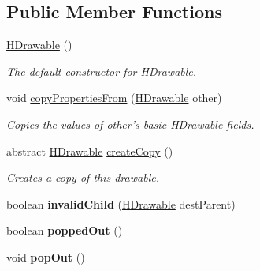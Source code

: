 \subsection*{Public Member Functions}
\begin{DoxyCompactItemize}
\item 
\hyperlink{classhype_1_1core_1_1drawable_1_1_h_drawable_ad92f7d4141143ac12489529b431a72e2}{H\-Drawable} ()
\begin{DoxyCompactList}\small\item\em The default constructor for \hyperlink{classhype_1_1core_1_1drawable_1_1_h_drawable}{H\-Drawable}. \end{DoxyCompactList}\item 
void \hyperlink{classhype_1_1core_1_1drawable_1_1_h_drawable_a5a24d647e0e8b14177218807e84ecde5}{copy\-Properties\-From} (\hyperlink{classhype_1_1core_1_1drawable_1_1_h_drawable}{H\-Drawable} other)
\begin{DoxyCompactList}\small\item\em Copies the values of {\ttfamily other}'s basic \hyperlink{classhype_1_1core_1_1drawable_1_1_h_drawable}{H\-Drawable} fields. \end{DoxyCompactList}\item 
abstract \hyperlink{classhype_1_1core_1_1drawable_1_1_h_drawable}{H\-Drawable} \hyperlink{classhype_1_1core_1_1drawable_1_1_h_drawable_aaee2df6588cdeebe4399e3e56af76410}{create\-Copy} ()
\begin{DoxyCompactList}\small\item\em Creates a copy of this drawable. \end{DoxyCompactList}\item 
\hypertarget{classhype_1_1core_1_1drawable_1_1_h_drawable_ab7f3fd6318c06868951949c3f14aafb0}{boolean {\bfseries invalid\-Child} (\hyperlink{classhype_1_1core_1_1drawable_1_1_h_drawable}{H\-Drawable} dest\-Parent)}\label{classhype_1_1core_1_1drawable_1_1_h_drawable_ab7f3fd6318c06868951949c3f14aafb0}

\item 
\hypertarget{classhype_1_1core_1_1drawable_1_1_h_drawable_a51e65250968e8feaf780174e26b86090}{boolean {\bfseries popped\-Out} ()}\label{classhype_1_1core_1_1drawable_1_1_h_drawable_a51e65250968e8feaf780174e26b86090}

\item 
\hypertarget{classhype_1_1core_1_1drawable_1_1_h_drawable_a02281398a0a841322423bf1010302720}{void {\bfseries pop\-Out} ()}\label{classhype_1_1core_1_1drawable_1_1_h_drawable_a02281398a0a841322423bf1010302720}


\end{DoxyCompactItemize}
